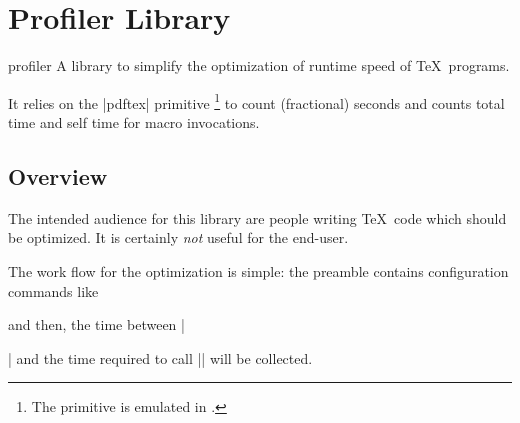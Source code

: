 %
%
%


\section{Profiler Library}

{}

\begin{pgflibrary}{profiler}
    A library to simplify the optimization of runtime speed of \TeX\ programs.

    It relies on the |pdftex| primitive
    \declareandlabel{\pdfelapsedtime}\footnote{The primitive is emulated in
    .} to count (fractional) seconds and counts total time and self time
    for macro invocations.
\end{pgflibrary}


\subsection{Overview}

The intended audience for this library are people writing \TeX\ code which
should be optimized. It is certainly \emph{not} useful for the end-user.

The work flow for the optimization is simple: the preamble contains
configuration commands like
%
\begin{codeexample}
\end{codeexample}
%
\noindent and then, the time between || and the time required to call |\pgfkeys| will be collected.


